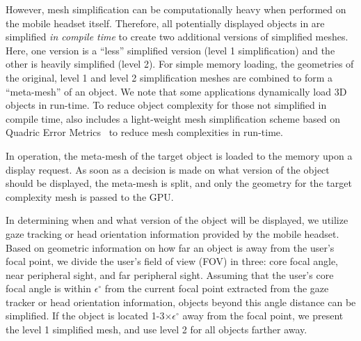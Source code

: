 
However, mesh simplification can be computationally heavy when performed on
the mobile headset itself. Therefore, all potentially displayed objects in {\myit} are
simplified \textit{in compile time} to create two 
additional versions of simplified meshes. Here, one version is a ``less'' 
simplified version (level 1 simplification) and the other is heavily simplified 
(level 2). For simple memory loading, the geometries of the original, 
level 1 and level 2 simplification meshes are combined to form a ``meta-mesh'' of an object.
We note that some applications dynamically load 3D objects in run-time. To reduce 
object complexity for those not simplified in compile time, {\myit} also includes
a light-weight mesh simplification scheme based on Quadric Error Metrics~\cite{Garland98}
to reduce mesh complexities in run-time.

In operation, the meta-mesh of the target object is loaded to the memory upon 
a display request. As soon as a decision is made on what version of the
object should be displayed, the meta-mesh is split, and only the geometry for the
target complexity mesh is passed to the GPU.%


In determining when and what version of the object will be displayed, we utilize 
gaze tracking or head orientation information provided by the mobile headset. 
Based on geometric information on how far an object is away from the user's focal 
point, we divide the user's field of view (FOV) in three: core focal 
angle, near peripheral sight, and far peripheral sight. 
%
Assuming that the user's core focal angle is within $\epsilon^\circ$ from the
current focal point extracted from the gaze tracker or head orientation 
information, objects beyond this angle distance can be simplified. If the object 
is located 1-3$\times\epsilon^\circ$ away from the focal point, we present
the level 1 simplified mesh, and use level 2 for all objects farther away. 
%




